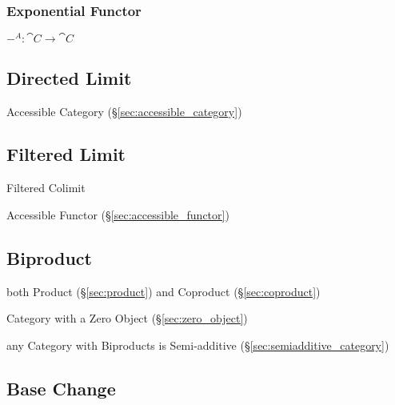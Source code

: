 \subsubsection{Exponential Functor}\label{sec:exponential_functor}

$-^A : \cat{C} \rightarrow \cat{C}$



\subsection{Directed Limit}\label{sec:directed_limit}

Accessible Category (\S\ref{sec:accessible_category})



\subsection{Filtered Limit}\label{sec:filtered_limit}

Filtered Colimit

Accessible Functor (\S\ref{sec:accessible_functor})



\subsection{Biproduct}\label{sec:biproduct}

both Product (\S\ref{sec:product}) and Coproduct
(\S\ref{sec:coproduct})

Category with a Zero Object (\S\ref{sec:zero_object})

any Category with Biproducts is Semi-additive
(\S\ref{sec:semiadditive_category})



\subsection{Base Change}\label{sec:base_change}

